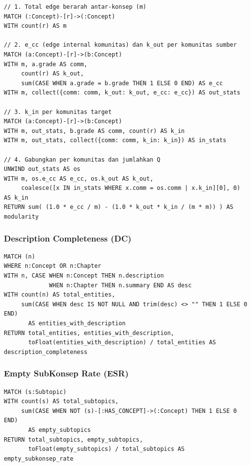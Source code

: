 \documentclass[../../thesis]{subfiles}
\begin{document}
\begin{lstlisting}[style=cypherbox,caption={Modularity berarah dengan partisi tetap = mata pelajaran.},label={lst:cypher-modularity}]
// 1. Total edge berarah antar-konsep (m)
MATCH (:Concept)-[r]->(:Concept)
WITH count(r) AS m

// 2. e_cc (edge internal komunitas) dan k_out per komunitas sumber
MATCH (a:Concept)-[r]->(b:Concept)
WITH m, a.grade AS comm,
     count(r) AS k_out,
     sum(CASE WHEN a.grade = b.grade THEN 1 ELSE 0 END) AS e_cc
WITH m, collect({comm: comm, k_out: k_out, e_cc: e_cc}) AS out_stats

// 3. k_in per komunitas target
MATCH (a:Concept)-[r]->(b:Concept)
WITH m, out_stats, b.grade AS comm, count(r) AS k_in
WITH m, out_stats, collect({comm: comm, k_in: k_in}) AS in_stats

// 4. Gabungkan per komunitas dan jumlahkan Q
UNWIND out_stats AS os
WITH m, os.e_cc AS e_cc, os.k_out AS k_out,
     coalesce([x IN in_stats WHERE x.comm = os.comm | x.k_in][0], 0) AS k_in
RETURN sum( (1.0 * e_cc / m) - (1.0 * k_out * k_in / (m * m)) ) AS modularity
\end{lstlisting}

\subsubsection{Description Completeness (DC)}

\begin{lstlisting}[style=cypherbox,caption={DC atas node :Concept (deskripsi) dan :Chapter (ringkasan).},label={lst:cypher-dc}]
MATCH (n)
WHERE n:Concept OR n:Chapter
WITH n, CASE WHEN n:Concept THEN n.description
             WHEN n:Chapter THEN n.summary END AS desc
WITH count(n) AS total_entities,
     sum(CASE WHEN desc IS NOT NULL AND trim(desc) <> "" THEN 1 ELSE 0 END)
       AS entities_with_description
RETURN total_entities, entities_with_description,
       toFloat(entities_with_description) / total_entities AS description_completeness
\end{lstlisting}

\subsubsection{Empty SubKonsep Rate (ESR)}

\begin{lstlisting}[style=cypherbox,caption={ESR: proporsi :Subtopic tanpa anak :Concept.},label={lst:cypher-esr}]
MATCH (s:Subtopic)
WITH count(s) AS total_subtopics,
     sum(CASE WHEN NOT (s)-[:HAS_CONCEPT]->(:Concept) THEN 1 ELSE 0 END)
       AS empty_subtopics
RETURN total_subtopics, empty_subtopics,
       toFloat(empty_subtopics) / total_subtopics AS empty_subkonsep_rate
\end{lstlisting}
\end{document}

